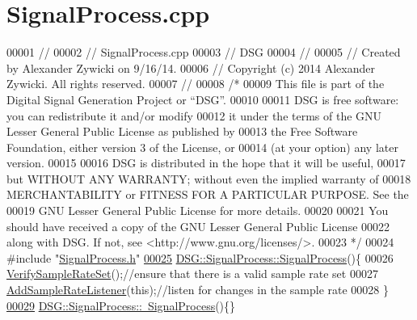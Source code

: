 \hypertarget{_signal_process_8cpp_source}{\section{Signal\+Process.\+cpp}
\label{_signal_process_8cpp_source}
}

\begin{DoxyCode}
00001 \textcolor{comment}{//}
00002 \textcolor{comment}{//  SignalProcess.cpp}
00003 \textcolor{comment}{//  DSG}
00004 \textcolor{comment}{//}
00005 \textcolor{comment}{//  Created by Alexander Zywicki on 9/16/14.}
00006 \textcolor{comment}{//  Copyright (c) 2014 Alexander Zywicki. All rights reserved.}
00007 \textcolor{comment}{//}
00008 \textcolor{comment}{/*}
00009 \textcolor{comment}{ This file is part of the Digital Signal Generation Project or “DSG”.}
00010 \textcolor{comment}{}
00011 \textcolor{comment}{ DSG is free software: you can redistribute it and/or modify}
00012 \textcolor{comment}{ it under the terms of the GNU Lesser General Public License as published by}
00013 \textcolor{comment}{ the Free Software Foundation, either version 3 of the License, or}
00014 \textcolor{comment}{ (at your option) any later version.}
00015 \textcolor{comment}{}
00016 \textcolor{comment}{ DSG is distributed in the hope that it will be useful,}
00017 \textcolor{comment}{ but WITHOUT ANY WARRANTY; without even the implied warranty of}
00018 \textcolor{comment}{ MERCHANTABILITY or FITNESS FOR A PARTICULAR PURPOSE.  See the}
00019 \textcolor{comment}{ GNU Lesser General Public License for more details.}
00020 \textcolor{comment}{}
00021 \textcolor{comment}{ You should have received a copy of the GNU Lesser General Public License}
00022 \textcolor{comment}{ along with DSG.  If not, see <http://www.gnu.org/licenses/>.}
00023 \textcolor{comment}{ */}
00024 \textcolor{preprocessor}{#include "\hyperlink{_signal_process_8h}{SignalProcess.h}"}
\hypertarget{_signal_process_8cpp_source_l00025}{}\hyperlink{class_d_s_g_1_1_signal_process_a3fd4347483bcf3cc0a3d7bf98ff56218}{00025} \hyperlink{class_d_s_g_1_1_signal_process_a3fd4347483bcf3cc0a3d7bf98ff56218}{DSG::SignalProcess::SignalProcess}()\{
00026     \hyperlink{namespace_d_s_g_a0749755eb0ed01894adc60fab768dfa5}{VerifySampleRateSet}();\textcolor{comment}{//ensure that there is a valid sample rate set}
00027     \hyperlink{namespace_d_s_g_a66af6119635fe556dc5f840bf78dec56}{AddSampleRateListener}(\textcolor{keyword}{this});\textcolor{comment}{//listen for changes in the sample rate}
00028 \}
\hypertarget{_signal_process_8cpp_source_l00029}{}\hyperlink{class_d_s_g_1_1_signal_process_ad9b6a758241a092ddc38e13effc9553f}{00029} \hyperlink{class_d_s_g_1_1_signal_process_ad9b6a758241a092ddc38e13effc9553f}{DSG::SignalProcess::~SignalProcess}()\{\}
\end{DoxyCode}
